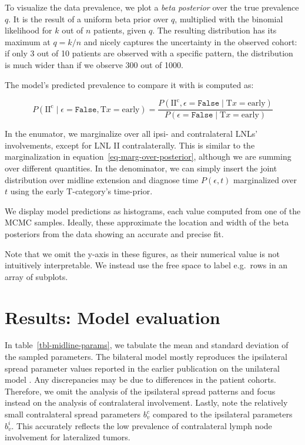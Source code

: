 \documentclass[
  sn-mathphys-num,
]{sn-jnl}
\begin{document}
To visualize the data prevalence, we plot a \emph{beta posterior} over
the true prevalence \(q\). It is the result of a uniform beta prior over
\(q\), multiplied with the binomial likelihood for \(k\) out of \(n\)
patients, given \(q\). The resulting distribution has its maximum at
\(q=k / n\) and nicely captures the uncertainty in the observed cohort:
if only 3 out of 10 patients are observed with a specific pattern, the
distribution is much wider than if we observe 300 out of 1000.

The model's predicted prevalence to compare it with is computed as:

\[
P \left( \text{II}^\text{c} \mid \epsilon=\texttt{False}, \text{T}x=\text{early} \right) = \frac{P \left( \text{II}^\text{c}, \epsilon=\texttt{False} \mid \text{T}x=\text{early} \right)}{P \left( \epsilon=\texttt{False} \mid \text{T}x=\text{early} \right)}
\]

In the enumator, we marginalize over all ipsi- and contralateral LNLs'
involvements, except for LNL II contralaterally. This is similar to the
marginalization in equation~\ref{eq-marg-over-posterior}, although we
are summing over different quantities. In the denominator, we can simply
insert the joint distribution over midline extension and diagnose time
\(P \left( \epsilon, t \right)\) marginalized over \(t\) using the early
T-category's time-prior.

We display model predictions as histograms, each value computed from one
of the MCMC samples. Ideally, these approximate the location and width
of the beta posteriors from the data showing an accurate and precise
fit.

Note that we omit the y-axis in these figures, as their numerical value
is not intuitively interpretable. We instead use the free space to label
e.g.~rows in an array of subplots.

\section{Results: Model evaluation}\label{sec-results}

In table~\ref{tbl-midline-params}, we tabulate the mean and standard
deviation of the sampled parameters. The bilateral model mostly
reproduces the ipsilateral spread parameter values reported in the
earlier publication on the unilateral model
\citep{ludwig_modelling_2023}. Any discrepancies may be due to
differences in the patient cohorts. Therefore, we omit the analysis of
the ipsilateral spread patterns and focus instead on the analysis of
contralateral involvement. Lastly, note the relatively small
contralateral spread parameters \(b^c_v\) compared to the ipsilateral
parameters \(b^i_v\). This accurately reflects the low prevalence of
contralateral lymph node involvement for lateralized tumors.
\end{document}
